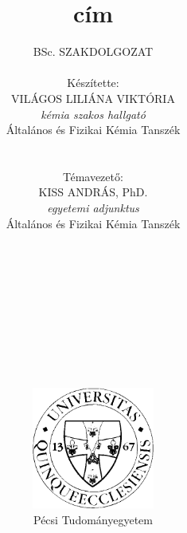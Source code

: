 \pagestyle{empty}

\title{\textbf{cím}}

\author{BSc. SZAKDOLGOZAT\\
\\ Készítette:\\ 
VILÁGOS LILIÁNA VIKTÓRIA \\
\emph{kémia szakos hallgató}\\
Általános és Fizikai Kémia Tanszék \\
\\ \\
Témavezető: \\
KISS ANDRÁS, PhD. \\
\emph{egyetemi adjunktus} \\
Általános és Fizikai Kémia Tanszék \\
\\ \\ \\ \\ \\ \\ \\ \\ \\ \\
\includegraphics[width=0.3\textwidth]{img/pte_logo.eps} \\ Pécsi Tudományegyetem}

\maketitle
\pagestyle{plain}

\large
\setcounter{tocdepth}{4}
\tableofcontents
